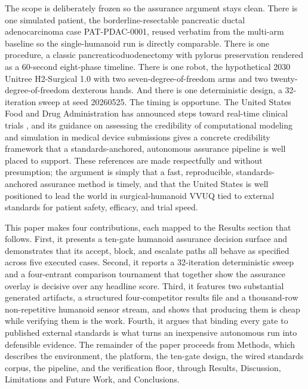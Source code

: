 The scope is deliberately frozen so the assurance argument stays clean. There is
one simulated patient, the borderline-resectable pancreatic ductal
adenocarcinoma case PAT-PDAC-0001, reused verbatim from the multi-arm baseline so
the single-humanoid run is directly comparable. There is one procedure, a classic
pancreaticoduodenectomy with pylorus preservation rendered as a 60-second
eight-phase timeline. There is one robot, the hypothetical 2030 Unitree
H2-Surgical 1.0 with two seven-degree-of-freedom arms and two
twenty-degree-of-freedom dexterous hands. And there is one deterministic design,
a 32-iteration sweep at seed 20260525. The timing is opportune. The United States
Food and Drug Administration has announced steps toward real-time clinical trials
\cite{fda2026realtime}, and its guidance on assessing the credibility of
computational modeling and simulation in medical device submissions
\cite{fda2023credibility} gives a concrete credibility framework that a
standards-anchored, autonomous assurance pipeline is well placed to support.
These references are made respectfully and without presumption; the argument is
simply that a fast, reproducible, standards-anchored assurance method is timely,
and that the United States is well positioned to lead the world in
surgical-humanoid VVUQ tied to external standards for patient safety, efficacy,
and trial speed.

This paper makes four contributions, each mapped to the Results section that
follows. First, it presents a ten-gate humanoid assurance decision surface and
demonstrates that its accept, block, and escalate paths all behave as specified
across five executed cases. Second, it reports a 32-iteration deterministic sweep
and a four-entrant comparison tournament that together show the assurance overlay
is decisive over any headline score. Third, it features two substantial generated
artifacts, a structured four-competitor results file and a thousand-row
non-repetitive humanoid sensor stream, and shows that producing them is cheap
while verifying them is the work. Fourth, it argues that binding every gate to
published external standards is what turns an inexpensive autonomous run into
defensible evidence. The remainder of the paper proceeds from Methods, which
describes the environment, the platform, the ten-gate design, the wired standards
corpus, the pipeline, and the verification floor, through Results, Discussion,
Limitations and Future Work, and Conclusions.
